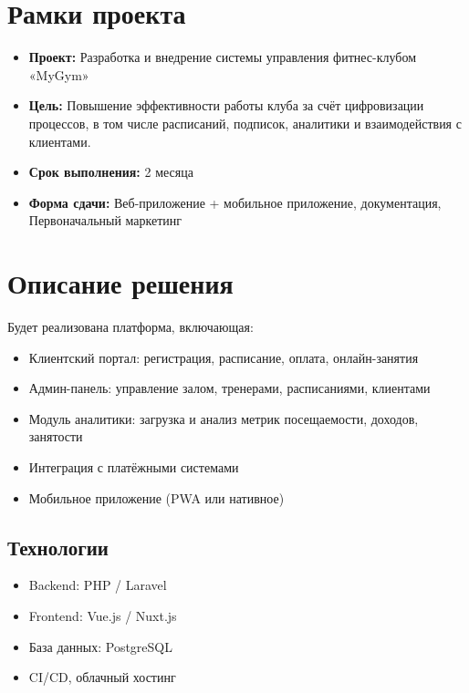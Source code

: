 \documentclass[14pt, russian]{matmex-diploma-custom}
\begin{document}
\section{Рамки проекта}

\begin{itemize}
    \item \textbf{Проект:} Разработка и внедрение системы управления фитнес-клубом «MyGym» \\
    \item \textbf{Цель:} Повышение эффективности работы клуба за счёт цифровизации процессов, в том числе расписаний, подписок, аналитики и взаимодействия с клиентами. \\
    \item \textbf{Срок выполнения:} 2 месяца \\
    \item \textbf{Форма сдачи:} Веб-приложение + мобильное приложение, документация, Первоначальный маркетинг
\end{itemize}

\section{Описание решения}

Будет реализована платформа, включающая:

\begin{itemize}[noitemsep]
    \item Клиентский портал: регистрация, расписание, оплата, онлайн-занятия
    \item Админ-панель: управление залом, тренерами, расписаниями, клиентами
    \item Модуль аналитики: загрузка и анализ метрик посещаемости, доходов, занятости
    \item Интеграция с платёжными системами
    \item Мобильное приложение (PWA или нативное)
\end{itemize}

\subsection{Технологии}

\begin{itemize}[noitemsep]
    \item Backend: PHP / Laravel
    \item Frontend: Vue.js / Nuxt.js
    \item База данных: PostgreSQL
    \item CI/CD, облачный хостинг
\end{itemize}
\end{document}
